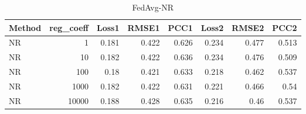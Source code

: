 \begin{table}
\caption{FedAvg-NR}
\begin{tabular}{lrrrrrrr}
\toprule
Method & reg_coeff & Loss1 & RMSE1 & PCC1 & Loss2 & RMSE2 & PCC2 \\
\midrule
NR & 1 & 0.181 & 0.422 & 0.626 & 0.234 & 0.477 & 0.513 \\
NR & 10 & 0.182 & 0.422 & 0.636 & 0.234 & 0.476 & 0.509 \\
NR & 100 & 0.18 & 0.421 & 0.633 & 0.218 & 0.462 & 0.537 \\
NR & 1000 & 0.182 & 0.422 & 0.631 & 0.221 & 0.466 & 0.54 \\
NR & 10000 & 0.188 & 0.428 & 0.635 & 0.216 & 0.46 & 0.537 \\
\bottomrule
\end{tabular}
\end{table}
